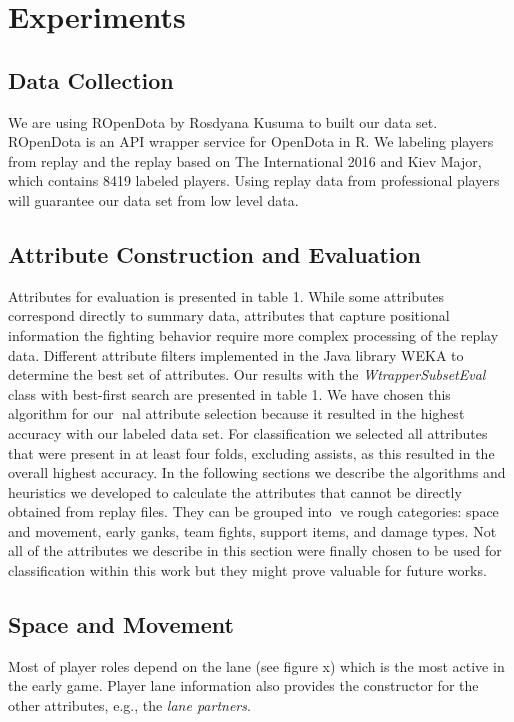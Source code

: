 \section{Experiments}
\label{sec:exp}

\subsection{Data Collection}
\label{sec:datacollection}

We are using ROpenDota by Rosdyana Kusuma to built our data set. ROpenDota is an API wrapper service for OpenDota in R. We labeling players from replay and the replay based on The International 2016 and Kiev Major, which contains 8419 labeled players. Using replay data from professional players will guarantee our data set from low level data.

\subsection{Attribute Construction and Evaluation}
\label{sec:attconsandeval}
Attributes for evaluation is presented in table 1. While some attributes correspond directly to summary data, attributes that capture positional information the fighting behavior require more complex processing of the replay data. Different attribute filters implemented in the Java library WEKA \cite{hall2009weka} to determine the best set of attributes. Our results with the \textit{WtrapperSubsetEval} class with best-first search are presented in table 1. We have chosen this algorithm for our nal attribute selection because it resulted in the highest accuracy with our labeled data set. For classification we selected all attributes that were present in at least four folds, excluding assists, as this resulted in the overall highest accuracy. In the following sections we describe the algorithms and heuristics we developed to calculate the attributes that cannot be directly obtained from replay files. They can be grouped into ve rough categories: space and movement, early ganks, team fights, support items, and damage types. Not all of the attributes we describe in this section were finally chosen to be used for classification within this work but they might prove valuable for future works.

\subsection{Space and Movement}
\label{spaceandmovement}
Most of player roles depend on the lane (see figure x) which is the most active in the early game. Player lane information also provides the constructor for the other attributes, e.g., the \textit{lane partners}. 